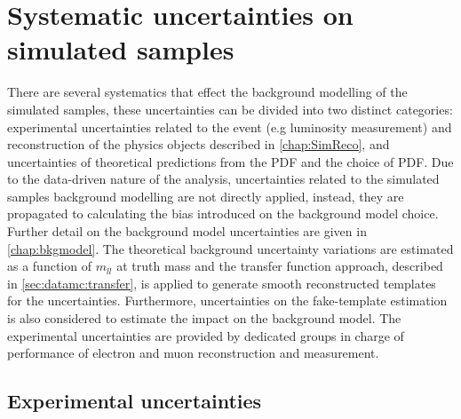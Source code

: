 \chapter{Systematic uncertainties on simulated samples}\label{chap:sysmc}

There are several systematics that effect the background modelling of the simulated samples, these uncertainties can be divided into two distinct categories: experimental uncertainties related to the event (e.g luminosity measurement) and reconstruction of the physics objects described in \cref{chap:SimReco}, and uncertainties of theoretical predictions from the PDF and the choice of PDF. Due to the data-driven nature of the analysis, uncertainties related to the simulated samples background modelling are not directly applied, instead, they are propagated to calculating the bias introduced on the background model choice. Further detail on the background model uncertainties are given in \cref{chap:bkgmodel}. The theoretical background uncertainty variations are estimated as a function of $m_{ll}$ at truth mass and the transfer function approach, described in \cref{sec:datamc:transfer}, is applied to generate smooth reconstructed templates for the uncertainties. Furthermore, uncertainties on the fake-template estimation is also considered to estimate the impact on the background model. The experimental uncertainties are provided by dedicated groups in charge of performance of electron and muon reconstruction and measurement.

\section{Experimental uncertainties}\label{sec:sysmc:exp}

